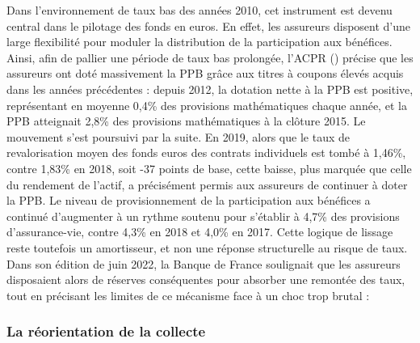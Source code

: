Dans l'environnement de taux bas des années 2010, cet instrument est devenu central dans le pilotage des fonds en euros. En effet, les assureurs disposent d'une large flexibilité pour moduler la distribution de la participation aux bénéfices. Ainsi, afin de pallier une période de taux bas prolongée, l'ACPR (\cite{evolution_ppb}) précise que les assureurs ont doté massivement la PPB grâce aux titres à coupons élevés acquis dans les années précédentes : depuis 2012, la dotation nette à la PPB est positive, représentant en moyenne 0,4\% des provisions mathématiques chaque année, et la PPB atteignait 2,8\% des provisions mathématiques à la clôture 2015. Le mouvement s'est poursuivi par la suite. En 2019, alors que le taux de revalorisation moyen des fonds euros des contrats individuels est tombé à 1,46\%, contre 1,83\% en 2018, soit -37 points de base, cette baisse, plus marquée que celle du rendement de l'actif, a précisément permis aux assureurs de continuer à doter la PPB. Le niveau de provisionnement de la participation aux bénéfices a continué d'augmenter à un rythme soutenu pour s'établir à 4,7\% des provisions d'assurance-vie, contre 4,3\% en 2018 et 4,0\% en 2017. Cette logique de lissage reste toutefois un amortisseur, et non une réponse structurelle au risque de taux. Dans son édition de juin 2022, la Banque de France soulignait que les assureurs disposaient alors de réserves conséquentes pour absorber une remontée des taux, tout en précisant les limites de ce mécanisme face à un choc trop brutal \cite{evolution_ppb_2} :

\begin{center}
\end{center}


\subsubsection{La réorientation de la collecte}

